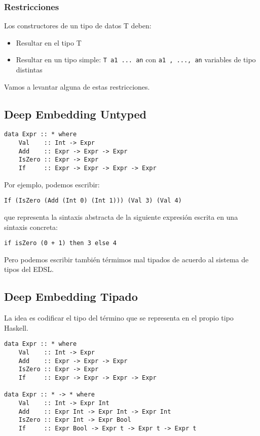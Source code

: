 \documentclass{article}
\newcommand{\imp}[1]{\textcolor{color1}{#1}}
\begin{document}
\subsubsection{Restricciones}

Los constructores de un tipo de datos \imp{T} deben:

\begin{itemize}
\item Resultar en el tipo \imp{T}
\item Resultar en un tipo simple: \texttt{\imp{T} a1 ... an} con \texttt{a1 , ..., an} variables de tipo distintas
\end{itemize}

Vamos a levantar alguna de estas restricciones.

\subsection{Deep Embedding Untyped}

\begin{lstlisting}
data Expr :: * where
    Val    :: Int -> Expr
    Add    :: Expr -> Expr -> Expr
    IsZero :: Expr -> Expr
    If     :: Expr -> Expr -> Expr -> Expr
\end{lstlisting}

Por ejemplo, podemos escribir:

\begin{lstlisting}
If (IsZero (Add (Int 0) (Int 1))) (Val 3) (Val 4)
\end{lstlisting}

que representa la sintaxis abstracta de la siguiente expresión escrita
en una sintaxis concreta:

\begin{lstlisting}
if isZero (0 + 1) then 3 else 4
\end{lstlisting}
Pero podemos escribir también térmimos \imp{mal tipados} de acuerdo al
sistema de tipos del EDSL.

\subsection{Deep Embedding Tipado}

La idea es codificar el tipo del término que se representa en el propio tipo Haskell.

\begin{lstlisting}
data Expr :: * where
    Val    :: Int -> Expr
    Add    :: Expr -> Expr -> Expr
    IsZero :: Expr -> Expr
    If     :: Expr -> Expr -> Expr -> Expr
    
data Expr :: * -> * where
    Val    :: Int -> Expr Int
    Add    :: Expr Int -> Expr Int -> Expr Int
    IsZero :: Expr Int -> Expr Bool
    If     :: Expr Bool -> Expr t -> Expr t -> Expr t
\end{lstlisting}
\end{document}
